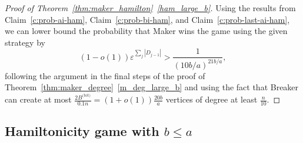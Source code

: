 \documentclass[11pt, a4paper]{article}
\numberwithin{equation}{section}
\numberwithin{figure}{section}
\newcommand{\eps}{\varepsilon}
\begin{document}
\begin{proof}[Proof of Theorem~\ref{thm:maker_hamilton}~\ref{ham_large_b}]
Using the results from Claim~\ref{c:prob-ai-ham}, Claim~\ref{c:prob-bi-ham}, and Claim~\ref{c:prob-last-ai-ham}, we can lower bound the probability that Maker wins the game using the given strategy by
$$
(1-o(1))\eps^{\sum_j |D_{j-1}|} > \frac{1}{(10b/a)^{21b/a}},
$$
following the argument in the final steps of the proof of Theorem~\ref{thm:maker_degree}~\ref{m_deg_large_b} and using the fact that Breaker can create at most $\frac{2B^{\text{(tot)}}}{0.1 n} = (1+o(1)) \frac{20b}{a}$ vertices of degree at least $\frac{n}{10}$.
\end{proof}





\bigskip


\subsection{Hamiltonicity game with $b \leq a$}
\end{document}
